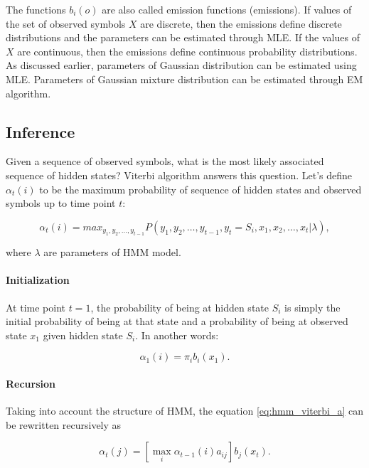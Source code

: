 \documentclass[thesis=B,english]{FITthesis}[2012/06/26]
\begin{document}
The functions $b_i(o)$ are also called emission functions (emissions). If values of the set of observed symbols $X$ are discrete, then the emissions define discrete distributions and the parameters can be estimated through MLE. If the values of $X$ are continuous, then the emissions define continuous probability distributions. As discussed earlier, parameters of Gaussian distribution can be estimated using MLE. Parameters of Gaussian mixture distribution can be estimated through EM algorithm.

\subsection{Inference}

Given a sequence of observed symbols, what is the most likely associated sequence of hidden states? Viterbi algorithm answers this question. Let's define $\alpha_t(i)$ to be the maximum probability of sequence of hidden states and observed symbols up to time point $t$:

\begin{equation} \label{eq:hmm_viterbi_a}
\alpha_t(i) = max_{y_1,y_2,\dots,y_{t-1}} P(y_1,y_2,\dots,y_{t-1},y_t = S_i,x_1,x_2,\dots,x_t | \lambda),
\end{equation}

where $\lambda$ are parameters of HMM model.

\paragraph{Initialization}

At time point $t=1$, the probability of being at hidden state $S_i$ is simply the initial probability of being at that state and a probability of being at observed state $x_1$ given hidden state $S_i$. In another words:

\begin{equation}
\alpha_1(i) = \pi_i b_i(x_1).
\end{equation}

\paragraph{Recursion}
Taking into account the structure of HMM, the equation \ref{eq:hmm_viterbi_a} can be rewritten recursively as

\begin{equation} \label{eq:hmm_viterbi_a_rec}
\alpha_t(j) = [\max_i \alpha_{t-1}(i)a_{ij}] b_j(x_t).
\end{equation}
\end{document}

